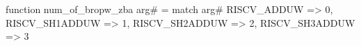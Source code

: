 function num_of_bropw_zba arg# = match arg# {
  RISCV_ADDUW => 0,
  RISCV_SH1ADDUW => 1,
  RISCV_SH2ADDUW => 2,
  RISCV_SH3ADDUW => 3
}
